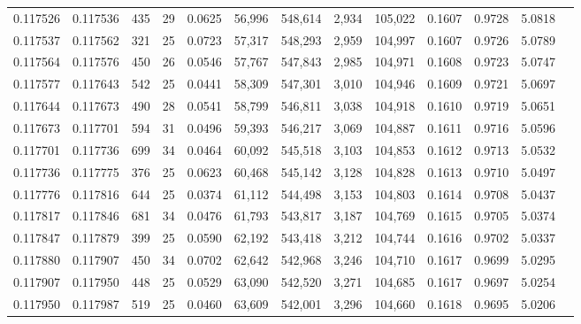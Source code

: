 \begin{tabular}{rrrrrrrrrrrrr}
0.117526 & 0.117536 & 435 &  29 &                                     0.0625 &  56,996 & 548,614 &   2,934 & 105,022 & 0.1607 & 0.9728 & 5.0818 \\
0.117537 & 0.117562 & 321 &  25 &                                     0.0723 &  57,317 & 548,293 &   2,959 & 104,997 & 0.1607 & 0.9726 & 5.0789 \\
0.117564 & 0.117576 & 450 &  26 &                                     0.0546 &  57,767 & 547,843 &   2,985 & 104,971 & 0.1608 & 0.9723 & 5.0747 \\
0.117577 & 0.117643 & 542 &  25 &                                     0.0441 &  58,309 & 547,301 &   3,010 & 104,946 & 0.1609 & 0.9721 & 5.0697 \\
0.117644 & 0.117673 & 490 &  28 &                                     0.0541 &  58,799 & 546,811 &   3,038 & 104,918 & 0.1610 & 0.9719 & 5.0651 \\
0.117673 & 0.117701 & 594 &  31 &                                     0.0496 &  59,393 & 546,217 &   3,069 & 104,887 & 0.1611 & 0.9716 & 5.0596 \\
0.117701 & 0.117736 & 699 &  34 &                                     0.0464 &  60,092 & 545,518 &   3,103 & 104,853 & 0.1612 & 0.9713 & 5.0532 \\
0.117736 & 0.117775 & 376 &  25 &                                     0.0623 &  60,468 & 545,142 &   3,128 & 104,828 & 0.1613 & 0.9710 & 5.0497 \\
0.117776 & 0.117816 & 644 &  25 &                                     0.0374 &  61,112 & 544,498 &   3,153 & 104,803 & 0.1614 & 0.9708 & 5.0437 \\
0.117817 & 0.117846 & 681 &  34 &                                     0.0476 &  61,793 & 543,817 &   3,187 & 104,769 & 0.1615 & 0.9705 & 5.0374 \\
0.117847 & 0.117879 & 399 &  25 &                                     0.0590 &  62,192 & 543,418 &   3,212 & 104,744 & 0.1616 & 0.9702 & 5.0337 \\
0.117880 & 0.117907 & 450 &  34 &                                     0.0702 &  62,642 & 542,968 &   3,246 & 104,710 & 0.1617 & 0.9699 & 5.0295 \\
0.117907 & 0.117950 & 448 &  25 &                                     0.0529 &  63,090 & 542,520 &   3,271 & 104,685 & 0.1617 & 0.9697 & 5.0254 \\
0.117950 & 0.117987 & 519 &  25 &                                     0.0460 &  63,609 & 542,001 &   3,296 & 104,660 & 0.1618 & 0.9695 & 5.0206 \\

\end{tabular}
